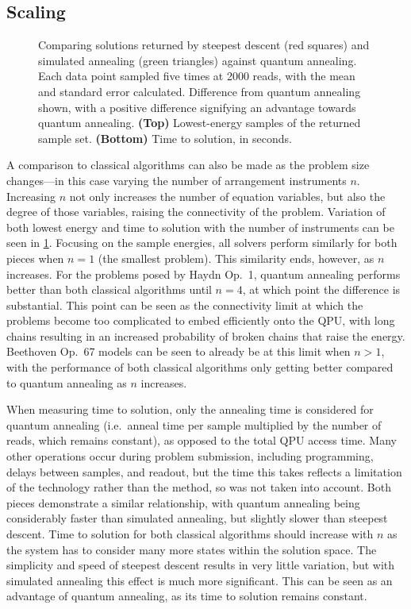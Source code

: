 \documentclass[twocolumn]{article}
\theoremstyle{definition}
\begin{document}
\subsection*{Scaling}

\begin{figure}[ht]
    \centering\footnotesize
    
    \caption{Comparing solutions returned by steepest descent (red squares) and simulated annealing (green triangles) against quantum annealing. Each data point sampled five times at \num{2000} reads, with the mean and standard error calculated. Difference from quantum annealing shown, with a positive difference signifying an advantage towards quantum annealing. \textbf{(Top)} Lowest-energy samples of the returned sample set. \textbf{(Bottom)} Time to solution, in seconds.}
    \label{fig:scaling}
\end{figure}

A comparison to classical algorithms can also be made as the problem size changes---in this case varying the number of arrangement instruments $n$. Increasing $n$ not only increases the number of equation variables, but also the degree of those variables, raising the connectivity of the problem. Variation of both lowest energy and time to solution with the number of instruments can be seen in \cref{fig:scaling}. Focusing on the sample energies, all solvers perform similarly for both pieces when $n=1$ (the smallest problem). This similarity ends, however, as $n$ increases. For the problems posed by Haydn Op.\ 1, quantum annealing performs better than both classical algorithms until $n=4$, at which point the difference is substantial. This point can be seen as the connectivity limit at which the problems become too complicated to embed efficiently onto the QPU, with long chains resulting in an increased probability of broken chains that raise the energy. Beethoven Op.\ 67 models can be seen to already be at this limit when $n>1$, with the performance of both classical algorithms only getting better compared to quantum annealing as $n$ increases.

When measuring time to solution, only the annealing time is considered for quantum annealing (i.e.\ anneal time per sample multiplied by the number of reads, which remains constant), as opposed to the total QPU access time. Many other operations occur during problem submission, including programming, delays between samples, and readout, but the time this takes reflects a limitation of the technology rather than the method, so was not taken into account. Both pieces demonstrate a similar relationship, with quantum annealing being considerably faster than simulated annealing, but slightly slower than steepest descent. Time to solution for both classical algorithms should increase with $n$ as the system has to consider many more states within the solution space. The simplicity and speed of steepest descent results in very little variation, but with simulated annealing this effect is much more significant. This can be seen as an advantage of quantum annealing, as its time to solution remains constant.
\end{document}

